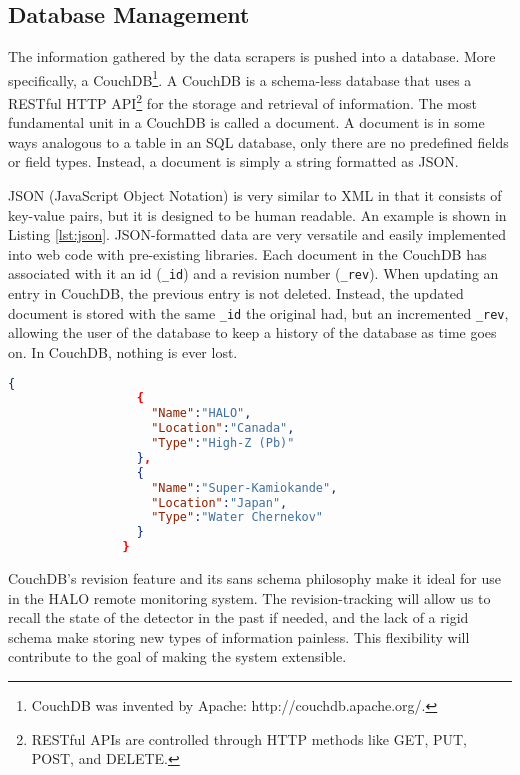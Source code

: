 		\subsection{Database Management}
			The information gathered by the data scrapers is pushed into a database. More specifically, a CouchDB\footnote{CouchDB was invented by Apache: http://couchdb.apache.org/.}. A CouchDB is a schema-less database that uses a RESTful HTTP API\footnote{RESTful APIs are controlled through HTTP methods like GET, PUT, POST, and DELETE.} for the storage and retrieval of information. The most fundamental unit in a CouchDB is called a document. A document is in some ways analogous to a table in an SQL database, only there are no predefined fields or field types. Instead, a document is simply a string formatted as JSON.

			JSON (JavaScript Object Notation) is very similar to XML in that it consists of key-value pairs, but it is designed to be human readable. An example is shown in Listing \nolinebreak \ref{lst:json}. JSON-formatted data are very versatile and easily implemented into web code with pre-existing libraries. Each document in the CouchDB has associated with it an id (\verb$_id$) and a revision number (\verb$_rev$). When updating an entry in CouchDB, the previous entry is not deleted. Instead, the updated document is stored with the same \verb$_id$ the original had, but an incremented \verb$_rev$, allowing the user of the database to keep a history of the database as time goes on. In CouchDB, nothing is ever lost. 

			\begin{lstlisting}[language=json,firstnumber=1,label=lst:json,caption=\it A JSON Example.\rm \\ Here is a short list of neutrino observatories with some descriptive attributes. This format is both human and machine readable!]
				{
				  {
				    "Name":"HALO",
				    "Location":"Canada",
				    "Type":"High-Z (Pb)"
				  },
				  {
				    "Name":"Super-Kamiokande",
				    "Location":"Japan",
				    "Type":"Water Chernekov"
				  }
				}
			\end{lstlisting}

			CouchDB's revision feature and its sans schema philosophy make it ideal for use in the HALO remote monitoring system. The revision-tracking will allow us to recall the state of the detector in the past if needed, and the lack of a rigid schema make storing new types of information painless. This flexibility will contribute to the goal of making the system extensible.


